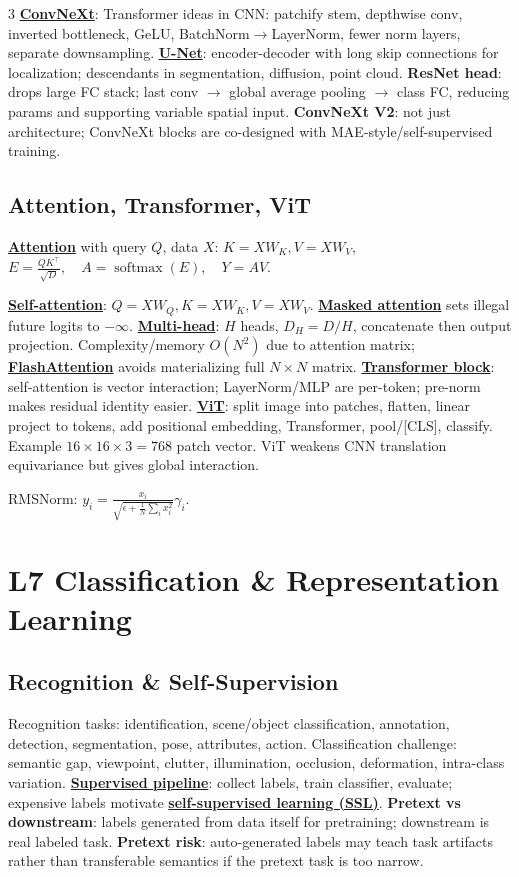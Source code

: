 \documentclass{article}
\numberwithin{equation}{subsection}
\newcommand{\key}[1]{\textbf{#1}}
\newcommand{\lowterm}[1]{\textbf{\underline{#1}}}
\DeclareMathOperator{\softmax}{softmax}
\begin{document}
\begin{multicols*}{3}
\lowterm{ConvNeXt}: Transformer ideas in CNN: patchify stem, depthwise conv, inverted bottleneck, GeLU, BatchNorm$\to$LayerNorm, fewer norm layers, separate downsampling. \lowterm{U-Net}: encoder-decoder with long skip connections for localization; descendants in segmentation, diffusion, point cloud. \key{ResNet head}: drops large FC stack; last conv $\to$ global average pooling $\to$ class FC, reducing params and supporting variable spatial input. \key{ConvNeXt V2}: not just architecture; ConvNeXt blocks are co-designed with MAE-style/self-supervised training.

\subsection{Attention, Transformer, ViT}
\lowterm{Attention} with query $Q$, data $X$: $K=XW_K,V=XW_V$,
\(
E=\frac{QK^\top}{\sqrt{D}},\quad A=\softmax(E),\quad Y=AV.
\)

\lowterm{Self-attention}: $Q=XW_Q,K=XW_K,V=XW_V$. \lowterm{Masked attention} sets illegal future logits to $-\infty$. \lowterm{Multi-head}: $H$ heads, $D_H=D/H$, concatenate then output projection. Complexity/memory $O(N^2)$ due to attention matrix; \lowterm{FlashAttention} avoids materializing full $N\times N$ matrix.
\lowterm{Transformer block}: self-attention is vector interaction; LayerNorm/MLP are per-token; pre-norm makes residual identity easier. \lowterm{ViT}: split image into patches, flatten, linear project to tokens, add positional embedding, Transformer, pool/[CLS], classify. Example $16\times16\times3=768$ patch vector. ViT weakens CNN translation equivariance but gives global interaction.

RMSNorm:
\(
y_i=\frac{x_i}{\sqrt{\epsilon+\frac1N\sum_i x_i^2}}\gamma_i.
\)

\section{L7 Classification \& Representation Learning}
\subsection{Recognition \& Self-Supervision}
Recognition tasks: identification, scene/object classification, annotation, detection, segmentation, pose, attributes, action. Classification challenge: semantic gap, viewpoint, clutter, illumination, occlusion, deformation, intra-class variation. \lowterm{Supervised pipeline}: collect labels, train classifier, evaluate; expensive labels motivate \lowterm{self-supervised learning (SSL)}.
\key{Pretext vs downstream}: labels generated from data itself for pretraining; downstream is real labeled task. \key{Pretext risk}: auto-generated labels may teach task artifacts rather than transferable semantics if the pretext task is too narrow.


\end{multicols*}
\end{document}
